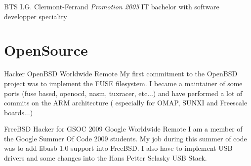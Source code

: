 \documentclass[11pt,a4paper,sans]{moderncv}
\begin{document}
{BTS}
{I.G.}
{Clermont-Ferrand}
{\textit{Promotion 2005}}
{IT bachelor with software developper speciality}

\section{OpenSource}

{Hacker}
{OpenBSD}
{Worldwide Remote}
{}
{My first commitment to the OpenBSD project was to implement the FUSE filesystem.\newline{}
I became a maintainer of some ports (fuse based, openocd, nasm, tuxracer, etc...) and have 
performed a lot of commits on the ARM architecture ( especially for OMAP, SUNXI and 
Freescale boards...) 
}

{FreeBSD Hacker for GSOC 2009}
{Google}
{Worldwide Remote}
{}
{I am a member of the Google Summer Of Code 2009 students. My job during this
summer of code was to add libusb-1.0 support into FreeBSD. I also have to
implement USB drivers and some changes into the Hans Petter Selasky USB Stack.
}
\end{document}
